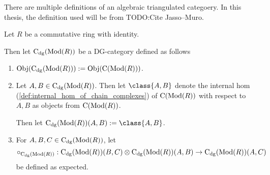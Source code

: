 There are multiple definitions of an algebraic triangulated categoery. In this thesis, the definition used will be from TODO:Cite Jasso--Muro.

\begin{definition}[\( \C_{\dg}(\Mod(R)) \)]
    Let \( R \) be a commutative ring with identity.

    Then let \emph{\( \C_{\dg}(\Mod(R)) \)} be a DG-category defined as follows
    \begin{enumerate}
        \item {
            \( \operatorname{Obj}(\operatorname{C}_{\operatorname{dg}}(\operatorname{Mod}(R))) := \operatorname{Obj}(\operatorname{C}(\operatorname{Mod}(R))) \).
        }
        \item {
            Let \( A, B \in \operatorname{C}_{\operatorname{dg}}(\operatorname{Mod}(R)) \). Then let \( \class{A, B} \) denote the internal hom (\autoref{def:internal_hom_of_chain_complexes}) of \( \operatorname{C}(\operatorname{Mod}(R)) \) with respect to \( A, B \) as objects from \( \operatorname{C}(\operatorname{Mod}(R)) \).

            Then let \( \C_{\dg}(\Mod(R))(A, B) := \class{A, B} \).

        }
        \item {
            For \( A, B, C \in \operatorname{C}_{\operatorname{dg}}(\operatorname{Mod}(R)) \), let
            \[
                \circ_{\operatorname{C}_{\operatorname{dg}}(\operatorname{Mod}(R))}: \operatorname{C}_{\operatorname{dg}}(\operatorname{Mod}(R))(B, C) \otimes \operatorname{C}_{\operatorname{dg}}(\operatorname{Mod}(R))(A, B) \to \operatorname{C}_{\operatorname{dg}}(\operatorname{Mod}(R))(A, C)
            \]
            be defined as expected.
        }
    \end{enumerate}
\end{definition}

